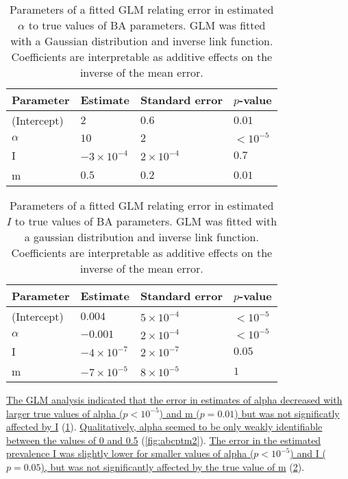 \begin{table}[ht]
\centering
\begin{tabular}{llll}
  \hline
Parameter & Estimate & Standard error & $p$-value \\ 
  \hline
(Intercept) & $2$ & $0.6$ & $0.01$ \\ 
  $\alpha$ & $10$ & $2$ & ${<}10^{-5}$ \\ 
  I & $-3\!\times\!10^{-4}$ & $2\!\times\!10^{-4}$ & $0.7$ \\ 
  m & $0.5$ & $0.2$ & $0.01$ \\ 
   \hline
\end{tabular}
\caption[Parameters of a fitted GLM relating error in estimated $\alpha$ to true values of BA parameters.]{Parameters of a fitted GLM relating error in estimated $\alpha$ to true values of BA parameters. GLM was fitted with a Gaussian distribution and inverse link function. Coefficients are interpretable as additive effects on the inverse of the mean error.} 
\label{tab:glmalpha}
\end{table}
\begin{table}[ht]
\centering
\begin{tabular}{llll}
  \hline
Parameter & Estimate & Standard error & $p$-value \\ 
  \hline
(Intercept) & $0.004$ & $5\!\times\!10^{-4}$ & ${<}10^{-5}$ \\ 
  $\alpha$ & $-0.001$ & $2\!\times\!10^{-4}$ & ${<}10^{-5}$ \\ 
  I & $-4\!\times\!10^{-7}$ & $2\!\times\!10^{-7}$ & $0.05$ \\ 
  m & $-7\!\times\!10^{-5}$ & $8\!\times\!10^{-5}$ & $1$ \\ 
   \hline
\end{tabular}
\caption[Parameters of a fitted GLM relating error in estimated $I$ to true values of BA parameters.]{Parameters of a fitted GLM relating error in estimated $I$ to true values of BA parameters. GLM was fitted with a gaussian distribution and inverse link function. Coefficients are interpretable as additive effects on the inverse of the mean error.} 
\label{tab:glmI}
\end{table}


{\color{blue}\uline{The \gls{GLM} analysis indicated that the error in estimates of
\gls{alpha} decreased with larger true values of \gls{alpha} 
    ($p {<}10^{-5}$)
and \gls{m}
    ($p =0.01$)
but was not significatly affected by \gls{I}} (\cref{tab:glmalpha}). 
\uline{Qualitatively, \gls{alpha} seemed to be only weakly identifiable between
the values of 0 and 0.5} (\cref{fig:abcptm2}). \uline{The error in the
estimated prevalence \gls{I} was slightly lower for smaller values of
\gls{alpha}
    ($p {<}10^{-5}$)
and \gls{I}
    ($p =0.05$),
but was not significantly affected by the true value of \gls{m}} 
(\cref{tab:glmI}).}

